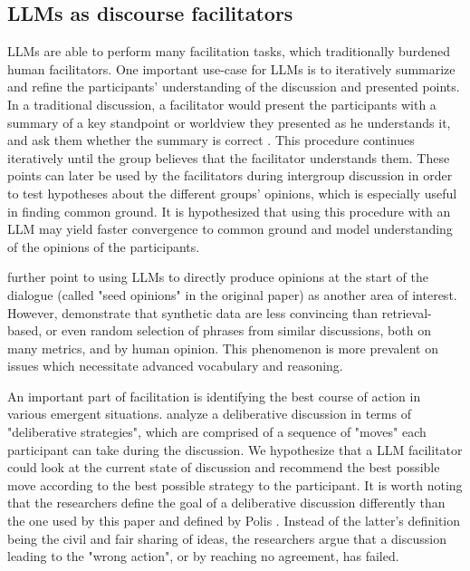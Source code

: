 \subsection{LLMs as discourse facilitators}
\label{sec:related:discource}


LLMs are able to perform many facilitation tasks, which traditionally burdened human facilitators. One important use-case for LLMs is to iteratively summarize and refine the participants' understanding of the discussion and presented points. In a traditional discussion, a facilitator would present the participants with a summary of a key standpoint or worldview they presented as he understands it, and ask them whether the summary is correct \cite{small-polis-llm, Tsai2024Generative}. This procedure continues iteratively until the group believes that the facilitator understands them. These points can later be used by the facilitators during intergroup discussion in order to test hypotheses about the different groups' opinions, which is especially useful in finding common ground. It is hypothesized \cite{small-polis-llm} that using this procedure with an LLM may yield faster convergence to common ground and model understanding of the opinions of the participants.

\citet{small-polis-llm} further point to using LLMs to directly produce opinions at the start of the dialogue (called "seed opinions" in the original paper) as another area of interest. However, \citet{karadzhov2023delidata} demonstrate that synthetic data are less convincing than retrieval-based, or even random selection of phrases from similar discussions, both on many metrics, and by human opinion. This phenomenon is more prevalent on issues which necessitate advanced vocabulary and reasoning.

An important part of facilitation is identifying the best course of action in various emergent situations. \citet{al-khatib-etal-2018-modeling} analyze a deliberative discussion in terms of "deliberative strategies", which are comprised of a sequence of "moves" each participant can take during the discussion. We hypothesize that a LLM facilitator could look at the current state of discussion and recommend the best possible move according to the best possible strategy to the participant. It is worth noting that the researchers define the goal of a deliberative discussion differently than the one used by this paper and defined by Polis \cite{small-polis-llm}. Instead of the latter's definition being the civil and fair sharing of ideas, the researchers argue that a discussion leading to the "wrong action", or by reaching no agreement, has failed.


